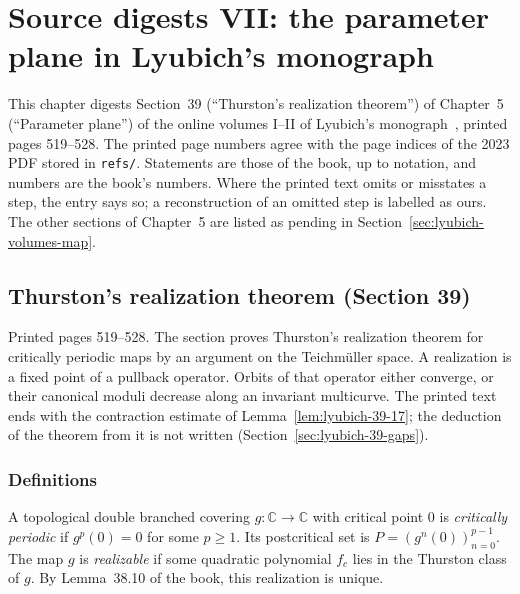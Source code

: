 \chapter[Parameter plane in Lyubich's monograph]{Source digests VII: the parameter plane in Lyubich's monograph}
\label{ch:digests-lyubich-parameter}

This chapter digests Section~39 (``Thurston's realization theorem'') of Chapter~5 (``Parameter plane'') of the online volumes I--II of
Lyubich's monograph~\cite{LyubichBook}, printed pages 519--528.  The printed page numbers agree with
the page indices of the 2023 PDF stored in \texttt{refs/}.  Statements are those of the book, up to
notation, and numbers are the book's numbers.  Where the printed text omits or misstates a step, the
entry says so; a reconstruction of an omitted step is labelled as ours.  The other sections of Chapter~5 are
listed as pending in Section~\ref{sec:lyubich-volumes-map}.

\section{Thurston's realization theorem (Section 39)}
\label{sec:lyubich-thurston}

Printed pages 519--528.  The section proves Thurston's realization theorem for critically periodic maps
by an argument on the Teichm\"uller space.  A realization is a fixed point of a pullback operator.  Orbits of
that operator either converge, or their canonical moduli decrease along an invariant multicurve.  The printed
text ends with the contraction estimate of Lemma~\ref{lem:lyubich-39-17}; the deduction of the theorem from it
is not written (Section~\ref{sec:lyubich-39-gaps}).

\subsection*{Definitions}

\begin{definition}
\label{def:lyubich-realizable}
A topological double branched covering $g\colon\mathbb C\to\mathbb C$ with critical point $0$ is
\emph{critically periodic} if $g^p(0)=0$ for some $p\ge1$.  Its postcritical set is
$P=(g^n(0))_{n=0}^{p-1}$.  The map $g$ is \emph{realizable} if some quadratic polynomial $f_c$ lies in the
Thurston class of $g$.  By Lemma~38.10 of the book, this realization is unique.
\end{definition}

